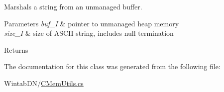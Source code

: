 Marshals a string from an unmanaged buffer. 


\begin{DoxyParams}{Parameters}
{\em buf\+\_\+I} & pointer to unmanaged heap memory\\
\hline
{\em size\+\_\+I} & size of A\+S\+C\+II string, includes null termination\\
\hline
\end{DoxyParams}
\begin{DoxyReturn}{Returns}

\end{DoxyReturn}


The documentation for this class was generated from the following file\+:\begin{DoxyCompactItemize}
\item 
Wintab\+D\+N/\mbox{\hyperlink{_c_mem_utils_8cs}{C\+Mem\+Utils.\+cs}}\end{DoxyCompactItemize}
